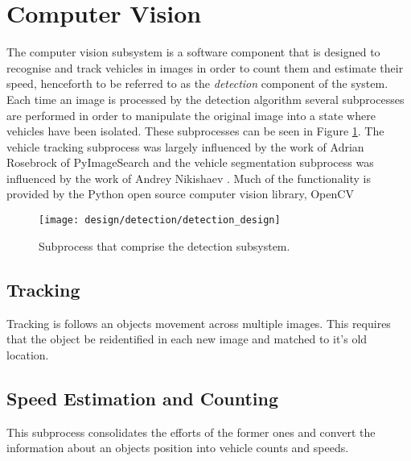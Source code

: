 \section{Computer Vision}

The computer vision subsystem is a software component that is designed to recognise and track vehicles in images in order to count them and estimate their speed, henceforth to be referred to as the \emph{detection} component of the system. Each time an image is processed by the detection algorithm several subprocesses are performed in order to manipulate the original image into a state where vehicles have been isolated. These subprocesses can be seen in Figure \ref{fig:detection_design}. The vehicle tracking subprocess was largely influenced by the work of Adrian Rosebrock \cite{adrian_rosebrock_simple_object_tracking}\cite{adrian_rosebrock_vehicle_tracking} of PyImageSearch and the vehicle segmentation subprocess was influenced by the work of Andrey Nikishaev \cite{andrey_nikishaev_traffic_counting}. Much of the functionality is provided by the Python open source computer vision library, OpenCV \cite{opencv}


\begin{figure}[H]
    \texttt{[image: design/detection/detection\_design]}
    \caption{Subprocess that comprise the detection subsystem.}
    \label{fig:detection_design}
\end{figure}






\subsection{Tracking}

Tracking is follows an objects movement across multiple images. This requires that the object be reidentified in each new image and matched to it's old location.

\subsection{Speed Estimation and Counting}

This subprocess consolidates the efforts of the former ones and convert the information about an objects position into vehicle counts and speeds.





